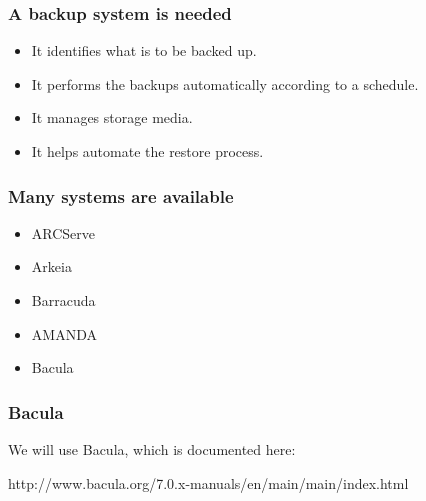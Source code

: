 \documentclass[10pt]{beamer}
\begin{document}
\begin{frame}
  \frametitle{A backup system is needed}

\begin{itemize}
\item It identifies what is to be backed up.
\item It performs the backups automatically according to a schedule.
\item It manages storage media.
\item It helps automate the restore process.
\end{itemize}
\end{frame}


\begin{frame}
  \frametitle{Many systems are available}

\begin{itemize}
\item ARCServe
\item Arkeia
\item Barracuda
\item AMANDA
\item Bacula
\end{itemize}
\end{frame}

\begin{frame}
  \frametitle{Bacula}

  We will use Bacula, which is documented here:
  
  http://www.bacula.org/7.0.x-manuals/en/main/main/index.html

\end{frame}
\end{document}
